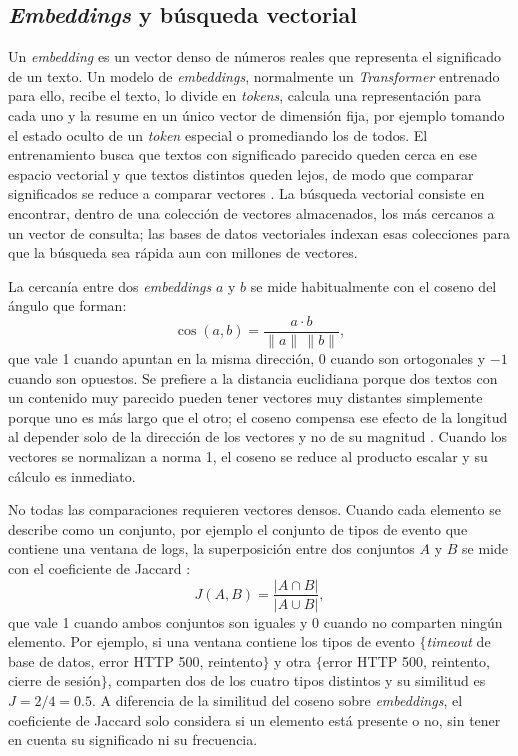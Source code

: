 \subsection{\textit{Embeddings} y búsqueda vectorial}\label{sec:mt_embeddings}

Un \textit{embedding} es un vector denso de números reales que representa el significado de un texto. Un modelo de \textit{embeddings}, normalmente un \textit{Transformer} entrenado para ello, recibe el texto, lo divide en \textit{tokens}, calcula una representación para cada uno y la resume en un único vector de dimensión fija, por ejemplo tomando el estado oculto de un \textit{token} especial o promediando los de todos. El entrenamiento busca que textos con significado parecido queden cerca en ese espacio vectorial y que textos distintos queden lejos, de modo que comparar significados se reduce a comparar vectores \cite{murphy2024_embeddings}. La búsqueda vectorial consiste en encontrar, dentro de una colección de vectores almacenados, los más cercanos a un vector de consulta; las bases de datos vectoriales indexan esas colecciones para que la búsqueda sea rápida aun con millones de vectores.

La cercanía entre dos \textit{embeddings} $a$ y $b$ se mide habitualmente con el coseno del ángulo que forman:
\begin{equation}
\cos(a, b) = \frac{a \cdot b}{\lVert a \rVert \, \lVert b \rVert},
\end{equation}
que vale 1 cuando apuntan en la misma dirección, 0 cuando son ortogonales y $-1$ cuando son opuestos. Se prefiere a la distancia euclidiana porque dos textos con un contenido muy parecido pueden tener vectores muy distantes simplemente porque uno es más largo que el otro; el coseno compensa ese efecto de la longitud al depender solo de la dirección de los vectores y no de su magnitud \cite{manning2008_ir}. Cuando los vectores se normalizan a norma 1, el coseno se reduce al producto escalar y su cálculo es inmediato.


No todas las comparaciones requieren vectores densos. Cuando cada elemento se describe como un conjunto, por ejemplo el conjunto de tipos de evento que contiene una ventana de logs, la superposición entre dos conjuntos $A$ y $B$ se mide con el coeficiente de Jaccard \cite{manning2008_ir}:
\begin{equation}
J(A, B) = \frac{|A \cap B|}{|A \cup B|},
\end{equation}
que vale 1 cuando ambos conjuntos son iguales y 0 cuando no comparten ningún elemento. Por ejemplo, si una ventana contiene los tipos de evento $\{$\textit{timeout} de base de datos, error HTTP 500, reintento$\}$ y otra $\{$error HTTP 500, reintento, cierre de sesión$\}$, comparten dos de los cuatro tipos distintos y su similitud es $J = 2/4 = 0.5$. A diferencia de la similitud del coseno sobre \textit{embeddings}, el coeficiente de Jaccard solo considera si un elemento está presente o no, sin tener en cuenta su significado ni su frecuencia.

